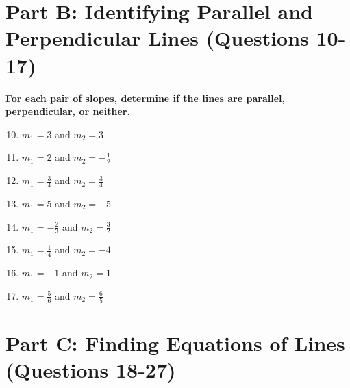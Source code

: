\documentclass[12pt]{article}
\begin{document}
\section*{Part B: Identifying Parallel and Perpendicular Lines (Questions 10-17)}

\noindent\textbf{For each pair of slopes, determine if the lines are parallel, perpendicular, or neither.}

\begin{enumerate}
\setcounter{enumi}{9}

\item $m_1 = 3$ and $m_2 = 3$

\vspace{0.8cm}

\item $m_1 = 2$ and $m_2 = -\frac{1}{2}$

\vspace{0.8cm}

\item $m_1 = \frac{3}{4}$ and $m_2 = \frac{3}{4}$

\vspace{0.8cm}

\item $m_1 = 5$ and $m_2 = -5$

\vspace{0.8cm}

\item $m_1 = -\frac{2}{3}$ and $m_2 = \frac{3}{2}$

\vspace{0.8cm}

\item $m_1 = \frac{1}{4}$ and $m_2 = -4$

\vspace{0.8cm}

\item $m_1 = -1$ and $m_2 = 1$

\vspace{0.8cm}

\item $m_1 = \frac{5}{6}$ and $m_2 = \frac{6}{5}$

\vspace{0.8cm}

\end{enumerate}

\section*{Part C: Finding Equations of Lines (Questions 18-27)}
\end{document}
